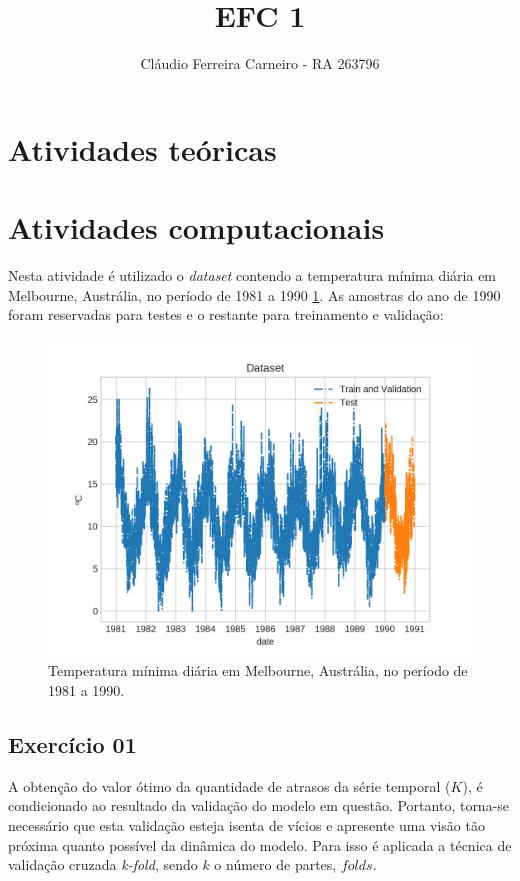 \documentclass{article}
\author{Cláudio Ferreira Carneiro - RA 263796}
\title{EFC 1}
\begin{document}
    \maketitle
    \newpage
    \section[]{Atividades teóricas}
    \section[]{Atividades computacionais}
    Nesta atividade é utilizado o \textit{dataset} contendo a temperatura mínima
    diária em Melbourne, Austrália, no período de 1981 a 1990 \ref{fig:dataset}. As amostras do ano
    de 1990 foram reservadas para testes e o restante para treinamento e validação:
    \begin{figure}[!h]
        \centering
        \includegraphics[width=\linewidth]{ex01/dataset.png}
        \caption{Temperatura mínima diária em Melbourne, Austrália, no período de 1981 a 1990.}
        \label{fig:dataset}
    \end{figure}
    \subsection[]{Exercício 01}
    A obtenção do valor ótimo da quantidade de atrasos da série temporal ($K$), 
    é condicionado ao resultado da validação do modelo em questão. Portanto, torna-se 
    necessário que esta validação esteja isenta de vícios e apresente uma visão tão próxima
    quanto possível da dinâmica do modelo. Para isso é aplicada a técnica de validação cruzada
    \textit{k-fold}, sendo $k$ o número de partes, $folds$.
\end{document}
